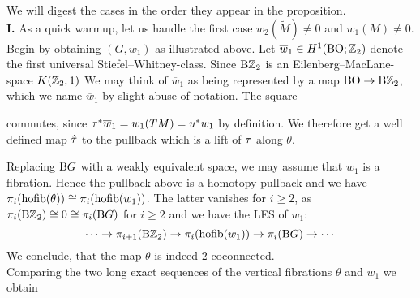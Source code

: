 \prf
    We will digest the cases in the order they appear in the proposition.\\
    \textbf{I.} As a quick warmup, let us handle the first case $w_2(\widetilde{M}) \neq 0$ and $w_1(M) \neq 0$. 
    Begin by obtaining $(G,w_1)$ as illustrated above.
    Let $\overline{w}_1\in H^1(\mathrm{BO}; \mathbb{Z}_2)$ denote the first universal Stiefel--Whitney-class.
    Since $\mathrm{B}\mathbb{Z}_2$ is an Eilenberg--MacLane-space $K(\mathbb{Z}_2, 1)$ We may think of $\overline{w}_1$ as being represented by a map $\mathrm{BO} \to \mathrm{B}\mathbb{Z}_2$, which we name $\overline{w}_1$ by slight abuse of notation.
    The square
    \begin{center}
    \end{center}
    commutes, since $\tau^\ast \overline{w}_1 = w_1(TM) = u^\ast w_1$ by definition.
    We therefore get a well defined map $\hat{\tau}$ to the pullback which is a lift of $\tau$ along $\theta$.
    \begin{center}
    \end{center}
    Replacing $\mathrm{B} G$ with a weakly equivalent space, we may assume that $w_1$ is a fibration.
    Hence the pullback above is a homotopy pullback and we have $\pi_i(\operatorname{hofib} (\theta)) \cong \pi_i(\operatorname{hofib} (w_1))$.
    The latter vanishes for $i\geq 2$, as $\pi_i(\mathrm{B}\mathbb{Z}_2) \cong 0 \cong \pi_i(\mathrm{B} G)$ for $i\geq 2$ and we have the LES of $w_1$:
    \begin{equation*}
        \cdots \to \pi_{i+1}(\mathrm{B}\mathbb{Z}_2) \to \pi_i(\operatorname{hofib} (w_1)) \to \pi_i(\mathrm{B} G) \to \cdots
    \end{equation*}
    We conclude, that the map $\theta$ is indeed $2$-coconnected.\\
    Comparing the two long exact sequences of the vertical fibrations $\theta$ and $w_1$ we obtain
    \begin{center}
    \end{center}
